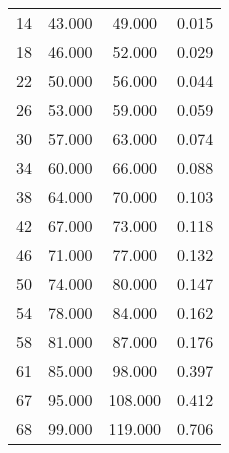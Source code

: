 % 
\begin{tabular}{cccc}
  \hline
  \hline
14 & 43.000 & 49.000 & 0.015 \\ 
  18 & 46.000 & 52.000 & 0.029 \\ 
  22 & 50.000 & 56.000 & 0.044 \\ 
  26 & 53.000 & 59.000 & 0.059 \\ 
  30 & 57.000 & 63.000 & 0.074 \\ 
  34 & 60.000 & 66.000 & 0.088 \\ 
  38 & 64.000 & 70.000 & 0.103 \\ 
  42 & 67.000 & 73.000 & 0.118 \\ 
  46 & 71.000 & 77.000 & 0.132 \\ 
  50 & 74.000 & 80.000 & 0.147 \\ 
  54 & 78.000 & 84.000 & 0.162 \\ 
  58 & 81.000 & 87.000 & 0.176 \\ 
  61 & 85.000 & 98.000 & 0.397 \\ 
  67 & 95.000 & 108.000 & 0.412 \\ 
  68 & 99.000 & 119.000 & 0.706 \\ 
   \hline
\end{tabular}
